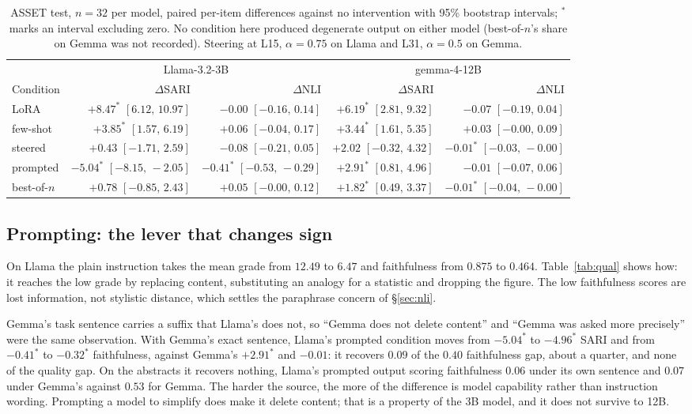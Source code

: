 \documentclass[aps,prb,reprint,nofootinbib,a4paper]{revtex4-2}
\begin{document}
\begin{table}[t]
\centering
\small
\caption{ASSET test, $n=32$ per model, paired per-item differences against no
intervention with 95\% bootstrap intervals; $^*$ marks an interval excluding
zero. No condition here produced degenerate output on either model
(best-of-$n$'s share on Gemma was not recorded). Steering at L15,
$\alpha=0.75$ on Llama and L31, $\alpha=0.5$ on Gemma.}
\begin{tabular}{@{}lrrrr@{}}
\toprule
& \multicolumn{2}{c}{Llama-3.2-3B} & \multicolumn{2}{c}{gemma-4-12B} \\
Condition & $\Delta$SARI & $\Delta$NLI & $\Delta$SARI & $\Delta$NLI \\
\midrule
LoRA        & $+8.47^{*}$ $[6.12,\,10.97]$  & $-0.00$ $[-0.16,\,0.14]$      & $+6.19^{*}$ $[2.81,\,9.32]$ & $-0.07$ $[-0.19,\,0.04]$ \\
few-shot    & $+3.85^{*}$ $[1.57,\,6.19]$   & $+0.06$ $[-0.04,\,0.17]$      & $+3.44^{*}$ $[1.61,\,5.35]$ & $+0.03$ $[-0.00,\,0.09]$ \\
steered     & $+0.43$ $[-1.71,\,2.59]$      & $-0.08$ $[-0.21,\,0.05]$      & $+2.02$ $[-0.32,\,4.32]$    & $-0.01^{*}$ $[-0.03,\,-0.00]$ \\
\midrule
prompted    & $-5.04^{*}$ $[-8.15,\,-2.05]$ & $-0.41^{*}$ $[-0.53,\,-0.29]$ & $+2.91^{*}$ $[0.81,\,4.96]$ & $-0.01$ $[-0.07,\,0.06]$ \\
best-of-$n$ & $+0.78$ $[-0.85,\,2.43]$      & $+0.05$ $[-0.00,\,0.12]$      & $+1.82^{*}$ $[0.49,\,3.37]$ & $-0.01^{*}$ $[-0.04,\,-0.00]$ \\
\bottomrule
\end{tabular}
\label{tab:asset}
\end{table}

\subsection{Prompting: the lever that changes sign}
\label{sec:bound}

On Llama the plain instruction takes the mean grade from $12.49$ to $6.47$ and
faithfulness from $0.875$ to $0.464$. Table~\ref{tab:qual} shows how: it
reaches the low grade by replacing content, substituting an analogy for a
statistic and dropping the figure. The low faithfulness scores are lost
information, not stylistic distance, which settles the paraphrase concern of
\S\ref{sec:nli}.

Gemma's task sentence carries a suffix that Llama's does not, so ``Gemma does
not delete content'' and ``Gemma was asked more precisely'' were the same
observation. With Gemma's exact sentence, Llama's prompted condition moves
from $-5.04^{*}$ to $-4.96^{*}$ SARI and from $-0.41^{*}$ to $-0.32^{*}$
faithfulness, against Gemma's $+2.91^{*}$ and $-0.01$: it recovers $0.09$ of
the $0.40$ faithfulness gap, about a quarter, and none of the quality gap. On
the abstracts it recovers nothing, Llama's prompted output scoring
faithfulness $0.06$ under its own sentence and $0.07$ under Gemma's against
$0.53$ for Gemma. The harder the source, the more of the difference is model
capability rather than instruction wording. Prompting a model to simplify does
make it delete content; that is a property of the 3B model, and it does not
survive to 12B.
\end{document}
